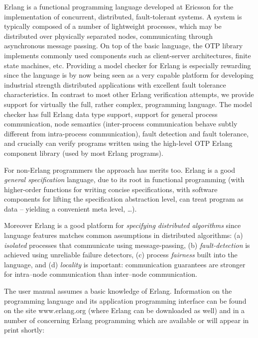 \documentclass[a4paper]{article}
\begin{document}
Erlang is a functional programming language developed at Ericsson for the
implementation of concurrent, distributed, fault-tolerant 
systems. A system is typically composed of a number of lightweight
processes, which may be distributed over physically separated
nodes, communicating through asynchronous message passing. 
On top of the basic language, the OTP library implements
commonly used components such as
client-server architectures, finite state machines, etc.
Providing a model checker for Erlang is especially rewarding
since the language is by now being seen as a very capable platform for
developing industrial strength distributed applications with excellent
fault tolerance characteristics.
In contrast to most other Erlang verification
attempts, we provide support for virtually the full, rather complex,
programming language. 
The model checker has full Erlang data type support, support
for general process communication, node semantics (inter-process
communication behave subtly different from intra-process communication), fault
detection and fault tolerance, and crucially can verify
programs written using the high-level
OTP Erlang component library (used by most Erlang programs).

For non-Erlang programmers the approach has merits too.
Erlang is a good {\em general specification} language, due to
its root in functional programming (with higher-order functions
for writing concise specifications, with software components
for lifting the specification abstraction level, 
can treat program as data -- yielding
a convenient meta level, \ldots).

Moreover Erlang is a good platform for {\em specifying 
distributed algorithms} since language
features matches common assumptions in distributed algorithms:
(a) {\em isolated} processes that communicate using message-passing,
(b) {\em fault-detection} is achieved using unreliable failure detectors,
(c) process {\em fairness} built into the language,
and (d) {\em locality} is important: communication guarantees 
are stronger for intra--node communication than inter--node communication.

The user manual assumes a basic knowledge of Erlang. Information
on the programming language and its application programming interface 
can be found on the site www.erlang.org
(where Erlang can be downloaded as well) and in a number of
concerning Erlang programming which are available or will appear in
print shortly:
\end{document}
